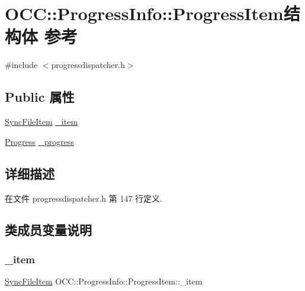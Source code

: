 \hypertarget{struct_o_c_c_1_1_progress_info_1_1_progress_item}{}\section{O\+CC\+:\+:Progress\+Info\+:\+:Progress\+Item结构体 参考}
\label{struct_o_c_c_1_1_progress_info_1_1_progress_item}


{\ttfamily \#include $<$progressdispatcher.\+h$>$}

\subsection*{Public 属性}
\begin{DoxyCompactItemize}
\item 
\hyperlink{class_o_c_c_1_1_sync_file_item}{Sync\+File\+Item} \hyperlink{struct_o_c_c_1_1_progress_info_1_1_progress_item_a516d4d9db9ae75ab8f22f5a0b2af22db}{\+\_\+item}
\item 
\hyperlink{struct_o_c_c_1_1_progress_info_1_1_progress}{Progress} \hyperlink{struct_o_c_c_1_1_progress_info_1_1_progress_item_a72b5a8d97ebb564e3967a5d4cc978aa4}{\+\_\+progress}
\end{DoxyCompactItemize}


\subsection{详细描述}


在文件 progressdispatcher.\+h 第 147 行定义.



\subsection{类成员变量说明}
\mbox{\label{struct_o_c_c_1_1_progress_info_1_1_progress_item_a516d4d9db9ae75ab8f22f5a0b2af22db}} 
\subsubsection{\texorpdfstring{\+\_\+item}{\_item}}
{\footnotesize\ttfamily \hyperlink{class_o_c_c_1_1_sync_file_item}{Sync\+File\+Item} O\+C\+C\+::\+Progress\+Info\+::\+Progress\+Item\+::\+\_\+item}




